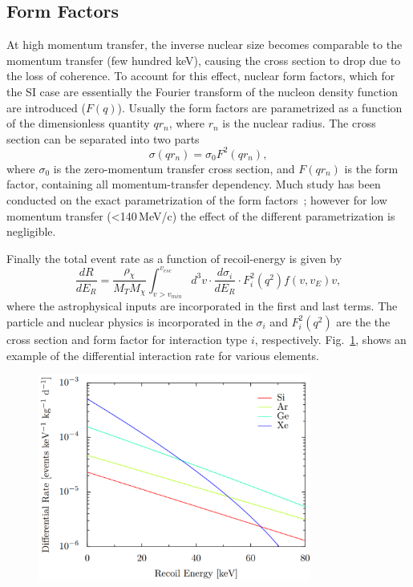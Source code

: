 \subsection{Form Factors}

At high momentum transfer, the inverse nuclear size becomes comparable to the momentum transfer (few hundred keV), causing the cross section to drop due to the loss of coherence. To account for this effect, nuclear form factors, which for the SI case are essentially the Fourier transform of the nucleon density function are introduced ($F(q)$). Usually the form factors are parametrized as a function of  the dimensionless quantity $qr_n$, where $r_n$ is the nuclear radius. The cross section can be separated into two parts
\begin{equation}
\sigma(qr_n) = \sigma_0F^2(qr_n),
\end{equation}
where $\sigma_0$ is the zero-momentum transfer cross section, and $F(qr_n)$ is the form factor, containing all momentum-transfer dependency. Much study has been conducted on the exact parametrization of the form factors~\cite{Feldstein:2009tr}; however for low momentum transfer (<140\,MeV/c) the effect of the different parametrization is negligible. 

Finally the total event rate as a function of recoil-energy is given by
\begin{equation}
\frac{dR}{dE_R} = \frac{\rho_\chi}{M_TM_\chi}\int_{v>v_{min}}^{v_{esc}}d^3v\cdot \frac{d\sigma_i}{dE_R}\cdot F_i^2(q^2)f(v,v_E)v,
\end{equation} 
where the astrophysical inputs are incorporated in the first and last terms. The particle and nuclear physics is incorporated in the $\sigma_i$ and $F^2_i(q^2)$ are the the cross section and form factor for interaction type $i$, respectively. Fig.~\ref{fig:interactionRate}, shows an example of the differential interaction rate for various elements.

\begin{figure}[t!]
	\centering
	\includegraphics[width=0.8\textwidth]{figs/EventRate.png}
	\label{fig:interactionRate}
\end{figure}

